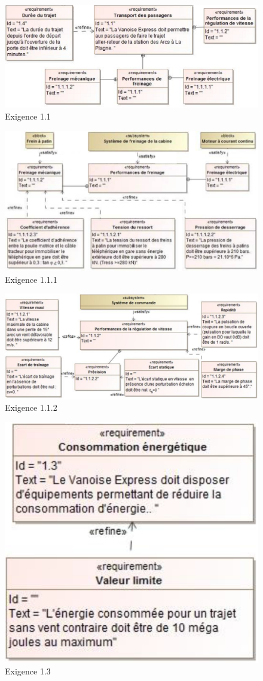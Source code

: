 \begin{figure}[!h]
\centering
\includegraphics[width=0.75\linewidth]{img/fig13}
\caption{Exigence 1.1}
\label{fig13}
\end{figure}

\begin{figure}[!h]
\centering
\includegraphics[width=0.75\linewidth]{img/fig14}
\caption{Exigence 1.1.1}
\label{fig14}
\end{figure}

\begin{figure}[!h]
\centering
\includegraphics[width=0.9\linewidth]{img/fig15}
\caption{Exigence 1.1.2}
\label{fig15}
\end{figure}

\begin{figure}[!h]
\centering
\includegraphics[width=0.3\linewidth]{img/fig16}
\caption{Exigence 1.3}
\label{fig16}
\end{figure}

